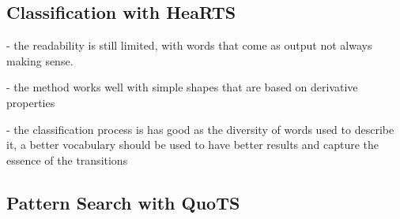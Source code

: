 \subsection{Classification with HeaRTS}

- the readability is still limited, with words that come as output not always making sense.

- the method works well with simple shapes that are based on derivative properties

- the classification process is has good as the diversity of words used to describe it, a better vocabulary should be used to have better results and capture the essence of the transitions

\subsection{Pattern Search with QuoTS}
